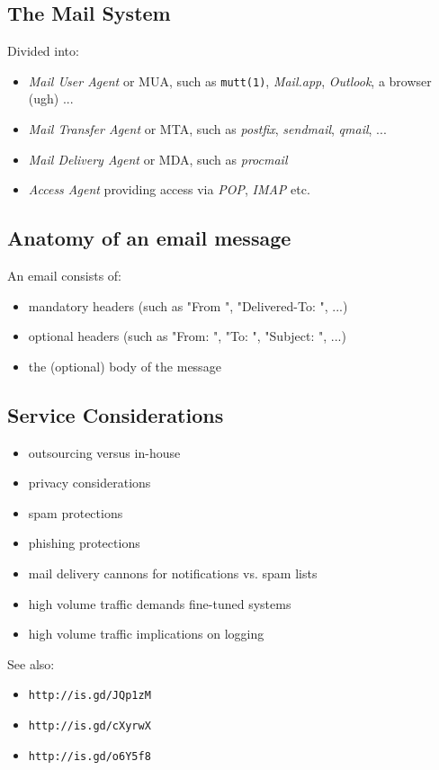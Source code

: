 \documentclass[xga]{xdvislides}
\begin{document}
\subsection{The Mail System}
Divided into:
\begin{itemize}
	\item {\em Mail User Agent} or MUA, such as {\tt mutt(1)}, {\em Mail.app}, {\em Outlook}, a browser (ugh) ...
	\item {\em Mail Transfer Agent} or MTA, such as {\em postfix},
		{\em sendmail}, {\em qmail}, ...
	\item {\em Mail Delivery Agent} or MDA, such as {\em procmail}
	\item {\em Access Agent} providing access via {\em POP}, {\em IMAP} etc.
\end{itemize}

\subsection{Anatomy of an email message}
An email consists of:
\begin{itemize}
	\item mandatory headers (such as "From ", "Delivered-To: ", ...)
	\item optional headers (such as "From: ", "To: ", "Subject: ", ...)
	\item the (optional) body of the message
\end{itemize}

\subsection{Service Considerations}
\begin{itemize}
	\item outsourcing versus in-house
	\item privacy considerations
	\item spam protections
	\item phishing protections
	\item mail delivery cannons for notifications vs. spam lists
	\item high volume traffic demands fine-tuned systems
	\item high volume traffic implications on logging
\end{itemize}
\vspace{.5in}
See also:
\begin{itemize}
	\item {\tt http://is.gd/JQp1zM}
	\item {\tt http://is.gd/cXyrwX}
	\item {\tt http://is.gd/o6Y5f8}
\end{itemize}
\end{document}
